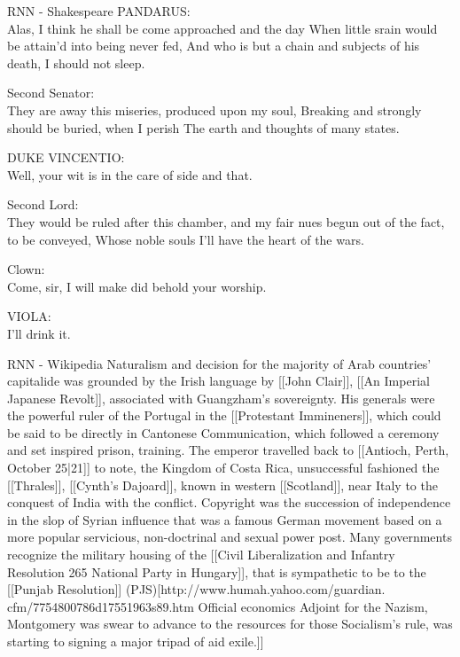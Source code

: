 \begin{frame}{RNN - Shakespeare}
PANDARUS:\\
Alas, I think he shall be come approached and the day
When little srain would be attain'd into being never fed,
And who is but a chain and subjects of his death,
I should not sleep.

Second Senator:\\
They are away this miseries, produced upon my soul,
Breaking and strongly should be buried, when I perish
The earth and thoughts of many states.

DUKE VINCENTIO:\\
Well, your wit is in the care of side and that.

Second Lord:\\
They would be ruled after this chamber, and
my fair nues begun out of the fact, to be conveyed,
Whose noble souls I'll have the heart of the wars.

Clown:\\
Come, sir, I will make did behold your worship.

VIOLA:\\
I'll drink it.
\end{frame}

\begin{frame}{RNN - Wikipedia}
Naturalism and decision for the majority of Arab countries' capitalide was grounded
by the Irish language by [[John Clair]], [[An Imperial Japanese Revolt]], associated
with Guangzham's sovereignty. His generals were the powerful ruler of the Portugal
in the [[Protestant Immineners]], which could be said to be directly in Cantonese
Communication, which followed a ceremony and set inspired prison, training. The
emperor travelled back to [[Antioch, Perth, October 25|21]] to note, the Kingdom
of Costa Rica, unsuccessful fashioned the [[Thrales]], [[Cynth's Dajoard]], known
in western [[Scotland]], near Italy to the conquest of India with the conflict.
Copyright was the succession of independence in the slop of Syrian influence that
was a famous German movement based on a more popular servicious, non-doctrinal
and sexual power post. Many governments recognize the military housing of the
[[Civil Liberalization and Infantry Resolution 265 National Party in Hungary]],
that is sympathetic to be to the [[Punjab Resolution]]
(PJS)[http://www.humah.yahoo.com/guardian.
cfm/7754800786d17551963s89.htm Official economics Adjoint for the Nazism, Montgomery
was swear to advance to the resources for those Socialism's rule,
was starting to signing a major tripad of aid exile.]]
\end{frame}


